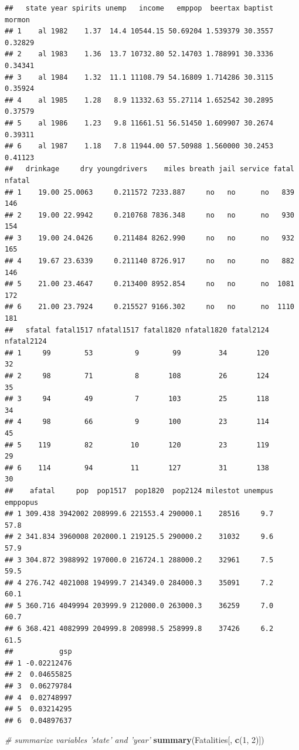 \documentclass[]{book}
\newenvironment{Shaded}{\begin{snugshade}}{\end{snugshade}}
\newcommand{\KeywordTok}[1]{\textcolor[rgb]{0.13,0.29,0.53}{\textbf{#1}}}
\newcommand{\DecValTok}[1]{\textcolor[rgb]{0.00,0.00,0.81}{#1}}
\newcommand{\CommentTok}[1]{\textcolor[rgb]{0.56,0.35,0.01}{\textit{#1}}}
\newcommand{\NormalTok}[1]{#1}
\theoremstyle{definition}
\theoremstyle{definition}
\theoremstyle{definition}
\theoremstyle{remark}
\begin{document}
\begin{verbatim}
##   state year spirits unemp   income   emppop  beertax baptist  mormon
## 1    al 1982    1.37  14.4 10544.15 50.69204 1.539379 30.3557 0.32829
## 2    al 1983    1.36  13.7 10732.80 52.14703 1.788991 30.3336 0.34341
## 3    al 1984    1.32  11.1 11108.79 54.16809 1.714286 30.3115 0.35924
## 4    al 1985    1.28   8.9 11332.63 55.27114 1.652542 30.2895 0.37579
## 5    al 1986    1.23   9.8 11661.51 56.51450 1.609907 30.2674 0.39311
## 6    al 1987    1.18   7.8 11944.00 57.50988 1.560000 30.2453 0.41123
##   drinkage     dry youngdrivers    miles breath jail service fatal nfatal
## 1    19.00 25.0063     0.211572 7233.887     no   no      no   839    146
## 2    19.00 22.9942     0.210768 7836.348     no   no      no   930    154
## 3    19.00 24.0426     0.211484 8262.990     no   no      no   932    165
## 4    19.67 23.6339     0.211140 8726.917     no   no      no   882    146
## 5    21.00 23.4647     0.213400 8952.854     no   no      no  1081    172
## 6    21.00 23.7924     0.215527 9166.302     no   no      no  1110    181
##   sfatal fatal1517 nfatal1517 fatal1820 nfatal1820 fatal2124 nfatal2124
## 1     99        53          9        99         34       120         32
## 2     98        71          8       108         26       124         35
## 3     94        49          7       103         25       118         34
## 4     98        66          9       100         23       114         45
## 5    119        82         10       120         23       119         29
## 6    114        94         11       127         31       138         30
##    afatal     pop  pop1517  pop1820  pop2124 milestot unempus emppopus
## 1 309.438 3942002 208999.6 221553.4 290000.1    28516     9.7     57.8
## 2 341.834 3960008 202000.1 219125.5 290000.2    31032     9.6     57.9
## 3 304.872 3988992 197000.0 216724.1 288000.2    32961     7.5     59.5
## 4 276.742 4021008 194999.7 214349.0 284000.3    35091     7.2     60.1
## 5 360.716 4049994 203999.9 212000.0 263000.3    36259     7.0     60.7
## 6 368.421 4082999 204999.8 208998.5 258999.8    37426     6.2     61.5
##           gsp
## 1 -0.02212476
## 2  0.04655825
## 3  0.06279784
## 4  0.02748997
## 5  0.03214295
## 6  0.04897637
\end{verbatim}

\begin{Shaded}
\begin{Highlighting}[]
\CommentTok{# summarize variables 'state' and 'year'}
\KeywordTok{summary}\NormalTok{(Fatalities[, }\KeywordTok{c}\NormalTok{(}\DecValTok{1}\NormalTok{, }\DecValTok{2}\NormalTok{)])}
\end{Highlighting}
\end{Shaded}
\end{document}
